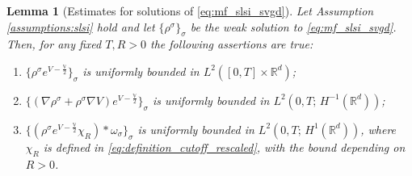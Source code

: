 \documentclass[reqno, 11pt]{amsart}
\numberwithin{equation}{section}
\newtheorem{lem}[thm]{Lemma}
\theoremstyle{definition}
\begin{document}
\begin{lem}[Estimates for solutions of \eqref{eq:mf_slsi_svgd}]
    \label{lem:estimates_slsi}
    Let Assumption \ref{assumptions:slsi} hold and let $\{\rho^\sigma\}_\sigma$ be the weak solution to \eqref{eq:mf_slsi_svgd}. Then, for any fixed $T,R>0$ the following assertions are true:
    \begin{enumerate}[label=(S\arabic*)]
        \item \label{bnd:rho}
        $\{\rho^\sigma e^{V-\frac{\mathbb{V}}{2}}\}_\sigma$ is uniformly bounded in $L^2([0,T]\times \mathbb{R}^{d})$;
        \item \label{bnd:h-1} $\{(\nabla\rho^\sigma +\rho^\sigma\nabla V)e^{V-\frac{\mathbb{V}}{2}}\}_\sigma$ is uniformly bounded in $L^2(0,T;\, H^{-1}(\mathbb{R}^{d}))$;
        \item \label{bnd:h1}
        $\{(\rho^{\sigma} e^{V-\frac{\mathbb{V}}{2}}\chi_R)\ast\omega_\sigma\}_\sigma$ is uniformly bounded in $L^2(0,T;\, H^1(\mathbb{R}^{d}))$, where $\chi_R$ is defined in \eqref{eq:definition_cutoff_rescaled}, with the bound depending on $R>0$.
    \end{enumerate}
\end{lem}
\end{document}
